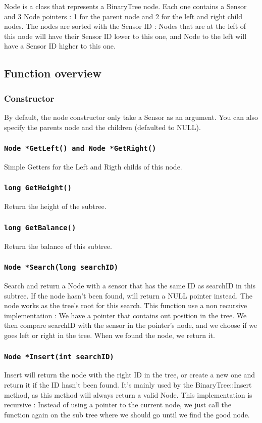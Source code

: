 \documentclass[10pt]{article}
\begin{document}
Node is a class that represents a BinaryTree node. Each one contains a Sensor and 3 Node pointers : 1 for the parent node and 2 for the left and right child nodes. The nodes are sorted with the Sensor ID : Nodes that are at the left of this node will have their Sensor ID lower to this one, and Node to the left will have a Sensor ID higher to this one.
\subsection{Function overview}
\subsubsection*{Constructor}
By default, the node constructor only take a Sensor as an argument. You can also specify the parents node and the children (defaulted to NULL).
\subsubsection*{\tt Node *GetLeft()  and Node *GetRight() }
Simple Getters for the Left and Rigth childs of this node.

\subsubsection*{\tt long GetHeight()}
Return the height of the subtree.

\subsubsection*{\tt long GetBalance()}
Return the balance of this subtree.

\subsubsection*{\tt Node *Search(long searchID)}
Search and return a Node with a sensor that has the same ID as searchID in this subtree. If the node hasn't been found, will return a NULL pointer instead.
The node works as the tree's root for this search. This function use a non recursive implementation : We have a pointer that contains out position in the tree. We then compare searchID with the sensor in the pointer's node, and we choose if we goes left or right in the tree. When we found the node, we return it.

\subsubsection*{\tt Node *Insert(int searchID)}
Insert will return the node with the right ID in the tree, or create a new one and return it if the ID hasn't been found. It's mainly used by the BinaryTree::Insert method, as this method will always return a valid Node.
This implementation is recursive : Instead of using a pointer to the current node, we just call the function again on the sub tree where we should go until we find the good node.
\end{document}
